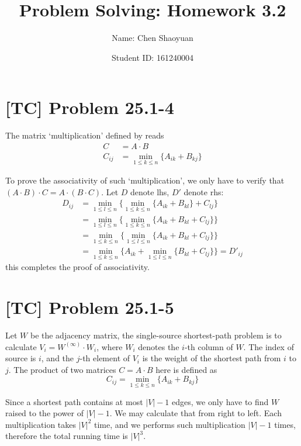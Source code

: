 \documentclass[a4paper,11pt,twocolumn]{article}
\newcommand{\homeworkno}{3.2}
\begin{document}
  \title{Problem Solving: Homework \homeworkno}
  \author{Name: Chen Shaoyuan \and Student ID: 161240004}
  \maketitle

  \section{[TC] Problem 25.1-4}
  The matrix `multiplication' defined by  reads
  \begin{align*}
    C &= A \cdot B \\
    C_{ij} &= \min_{1 \leq k \leq n} \{ A_{ik} + B_{kj} \}
  \end{align*}\par
  To prove the associativity of such `multiplication', we only have to verify that $(A \cdot B) \cdot C = A \cdot (B \cdot C)$. Let $D$ denote lhs, $D'$ denote rhs:
  \begin{align*}
    D_{ij} &= \min_{1 \leq l \leq n} \{ \min_{1 \leq k \leq n} \{ A_{ik} + B_{kl} \} + C_{lj} \} \\
    &= \min_{1 \leq l \leq n} \{ \min_{1 \leq k \leq n} \{ A_{ik} + B_{kl} + C_{lj} \} \} \\
    &= \min_{1 \leq k \leq n} \{ \min_{1 \leq l \leq n} \{ A_{ik} + B_{kl} + C_{lj} \} \} \\
    &= \min_{1 \leq k \leq n} \{ A_{ik} + \min_{1 \leq l \leq n} \{B_{kl}  + C_{lj} \} \} = D'_{ij}
  \end{align*}
  this completes the proof of associativity.

  \section{[TC] Problem 25.1-5}
  Let $W$ be the adjacency matrix, the single-source shortest-path problem is to calculate $V_i = W ^ {(\infty)} \cdot W_i$, where $W_i$ denotes the $i$-th column of $W$. The index of source is $i$, and the $j$-th element of $V_i$ is the weight of the shortest path from $i$ to $j$. The product of two matrices $C = A \cdot B$ here is defined as
  $$ C_{ij} = \min_{1 \leq k \leq n} \{ A_{ik} + B_{kj} \} $$ \par
  Since a shortest path contains at most $|V|-1$ edges, we only have to find $W$ raised to the power of $|V|-1$. We may calculate that from right to left. Each multiplication takes $|V|^2$ time, and we performs such multiplication $|V|-1$ times, therefore the total running time is $|V|^3$.
  
\end{document}
